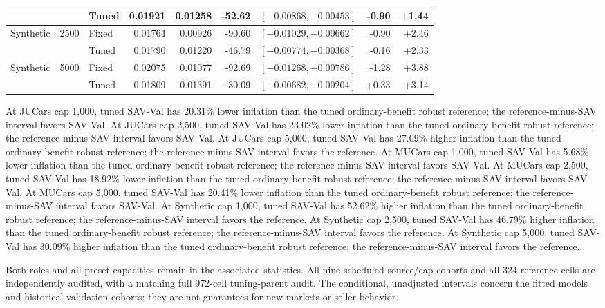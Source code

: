 \documentclass[10pt,journal]{IEEEtran}
\begin{document}
\begin{table}[t]
\begin{tabular}{lrlrrrrrr}
 &  & Tuned & 0.01921 & 0.01258 & -52.62 & $[-0.00868,-0.00453]$ & -0.90 & +1.44\\
\midrule
Synthetic & 2500 & Fixed & 0.01764 & 0.00926 & -90.60 & $[-0.01029,-0.00662]$ & -0.90 & +2.46\\
 &  & Tuned & 0.01790 & 0.01220 & -46.79 & $[-0.00774,-0.00368]$ & -0.16 & +2.33\\
\midrule
Synthetic & 5000 & Fixed & 0.02075 & 0.01077 & -92.69 & $[-0.01268,-0.00786]$ & -1.28 & +3.88\\
 &  & Tuned & 0.01809 & 0.01391 & -30.09 & $[-0.00682,-0.00204]$ & +0.33 & +3.14\\
\bottomrule
\end{tabular}
\end{table}

At JUCars cap 1,000, tuned SAV-Val has 20.31\% lower inflation than the tuned ordinary-benefit robust reference; the reference-minus-SAV interval favors SAV-Val.
At JUCars cap 2,500, tuned SAV-Val has 23.02\% lower inflation than the tuned ordinary-benefit robust reference; the reference-minus-SAV interval favors SAV-Val.
At JUCars cap 5,000, tuned SAV-Val has 27.09\% higher inflation than the tuned ordinary-benefit robust reference; the reference-minus-SAV interval favors the reference.
At MUCars cap 1,000, tuned SAV-Val has 5.68\% lower inflation than the tuned ordinary-benefit robust reference; the reference-minus-SAV interval favors SAV-Val.
At MUCars cap 2,500, tuned SAV-Val has 18.92\% lower inflation than the tuned ordinary-benefit robust reference; the reference-minus-SAV interval favors SAV-Val.
At MUCars cap 5,000, tuned SAV-Val has 20.41\% lower inflation than the tuned ordinary-benefit robust reference; the reference-minus-SAV interval favors SAV-Val.
At Synthetic cap 1,000, tuned SAV-Val has 52.62\% higher inflation than the tuned ordinary-benefit robust reference; the reference-minus-SAV interval favors the reference.
At Synthetic cap 2,500, tuned SAV-Val has 46.79\% higher inflation than the tuned ordinary-benefit robust reference; the reference-minus-SAV interval favors the reference.
At Synthetic cap 5,000, tuned SAV-Val has 30.09\% higher inflation than the tuned ordinary-benefit robust reference; the reference-minus-SAV interval favors the reference.

Both roles and all preset capacities remain in the associated statistics.
All nine scheduled source/cap cohorts and all 324 reference cells are independently audited, with a matching full 972-cell tuning-parent audit. The conditional,
unadjusted intervals concern the fitted models and historical validation
cohorts; they are not guarantees for new markets or seller behavior.
\end{document}
